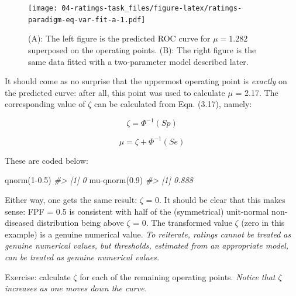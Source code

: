 \documentclass[
]{book}
\newenvironment{Shaded}{\begin{snugshade}}{\end{snugshade}}
\newcommand{\CommentTok}[1]{\textcolor[rgb]{0.56,0.35,0.01}{\textit{#1}}}
\newcommand{\DecValTok}[1]{\textcolor[rgb]{0.00,0.00,0.81}{#1}}
\newcommand{\FloatTok}[1]{\textcolor[rgb]{0.00,0.00,0.81}{#1}}
\newcommand{\FunctionTok}[1]{\textcolor[rgb]{0.00,0.00,0.00}{#1}}
\newcommand{\NormalTok}[1]{#1}
\newcommand{\SpecialCharTok}[1]{\textcolor[rgb]{0.00,0.00,0.00}{#1}}
\begin{document}
\begin{figure}
\centering
\texttt{[image: 04-ratings-task\_files/figure-latex/ratings-paradigm-eq-var-fit-a-1.pdf]}
\caption{\label{fig:ratings-paradigm-eq-var-fit-a}(A): The left figure is the predicted ROC curve for \(\mu=1.282\) superposed on the operating points. (B): The right figure is the same data fitted with a two-parameter model described later.}
\end{figure}

It should come as no surprise that the uppermost operating point is \emph{exactly} on the predicted curve: after all, this point was used to calculate \(\mu\) = 2.17. The corresponding value of \(\zeta\) can be calculated from Eqn. (3.17), namely:

\begin{equation*} 
\zeta = \Phi^{-1}\left ( Sp \right )
\label{eq:ratings-paradigm-Zeta}
\end{equation*}

\begin{equation*} 
\mu = \zeta + \Phi^{-1}\left ( Se \right )
\label{eq:ratings-paradigm-Mu}
\end{equation*}

These are coded below:

\begin{Shaded}
\begin{Highlighting}[]
\FunctionTok{qnorm}\NormalTok{(}\DecValTok{1}\FloatTok{{-}0.5}\NormalTok{)}
\CommentTok{\#\textgreater{} [1] 0}
\NormalTok{mu}\SpecialCharTok{{-}}\FunctionTok{qnorm}\NormalTok{(}\FloatTok{0.9}\NormalTok{)}
\CommentTok{\#\textgreater{} [1] 0.888}
\end{Highlighting}
\end{Shaded}

Either way, one gets the same result: \(\zeta\) = 0. It should be clear that this makes sense: FPF = 0.5 is consistent with half of the (symmetrical) unit-normal non-diseased distribution being above \(\zeta\) = 0. The transformed value \(\zeta\) (zero in this example) is a genuine numerical value. \emph{To reiterate, ratings cannot be treated as genuine numerical values, but thresholds, estimated from an appropriate model, can be treated as genuine numerical values.}

Exercise: calculate \(\zeta\) for each of the remaining operating points. \emph{Notice that \(\zeta\) increases as one moves down the curve.}
\end{document}
